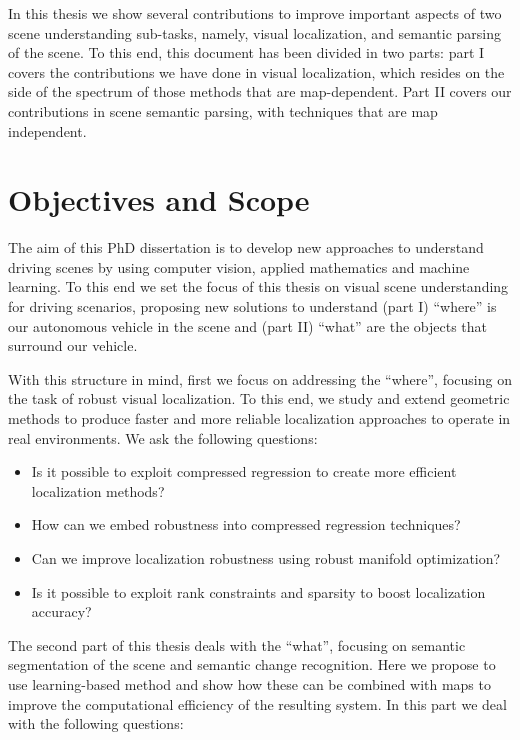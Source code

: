In this thesis we show several contributions to improve important aspects of two scene understanding sub-tasks, namely, visual localization, and semantic parsing of the scene. To this end, this document has been divided in two parts: part I covers the contributions we have done in visual localization, which resides on the side of the spectrum of those methods that are map-dependent. Part II covers our contributions in scene semantic parsing, with techniques that are map independent.


\section{Objectives and Scope} 

The aim of this PhD dissertation is to develop new approaches to understand driving scenes by using computer vision, applied mathematics and machine learning. To this end we set the focus of this thesis on visual scene understanding for driving scenarios, proposing new solutions to understand (part I) ``where'' is our autonomous vehicle in the scene and (part II) ``what'' are the objects that surround our vehicle.

With this structure in mind, first we focus on addressing the ``where'', focusing on the task of robust visual localization. To this end, we study and extend geometric methods to produce faster and more reliable localization approaches to operate in real environments. We ask the following questions:

\begin{itemize}
\item Is it possible to exploit compressed regression to create more efficient localization methods?
\item How can we embed robustness into compressed regression techniques?
\item Can we improve localization robustness using robust manifold optimization?
\item Is it possible to exploit rank constraints and sparsity to boost localization accuracy? 
\end{itemize}

The second part of this thesis deals with  the ``what'', focusing on semantic segmentation of the scene and semantic change recognition. Here we propose to use learning-based method and show how these can be combined with maps to improve the computational efficiency of the resulting system. In this part we deal with the following questions:

